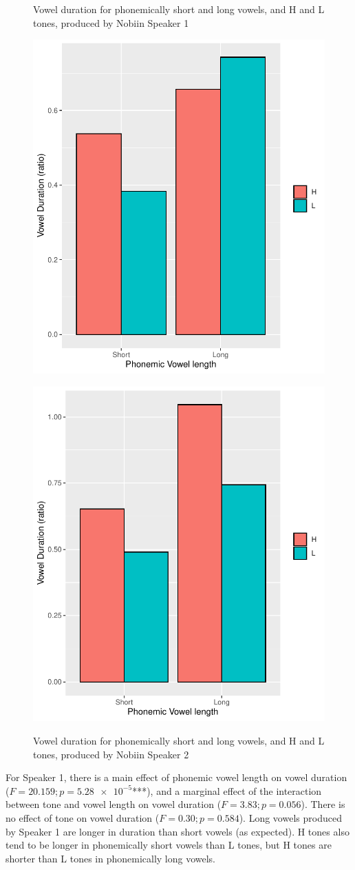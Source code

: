 \documentclass[output=paper]{langscibook}
\begin{document}
\begin{figure}
 \begin{floatrow}
  \captionsetup{margin=.05\linewidth}
   \ffigbox
     {\caption{Vowel duration for phonemically short and long vowels, and H and L tones, produced by Nobiin Speaker 1\label{fig:oakley:TanutVowelDur}}}
     {\includegraphics[width=.5\textwidth]{figures/TanutVowelDurBar.pdf}}%
   \ffigbox
     {\caption{Vowel duration for phonemically short and long vowels, and H and L tones, produced by Nobiin Speaker 2\label{fig:oakley:NubanVowelDur}}}
     {\includegraphics[width=.5\textwidth]{figures/NubanVowelDurBar.pdf}}
 \end{floatrow}
\end{figure}

For Speaker 1, there is a main effect of phonemic vowel length on vowel duration ($F=20.159; p=\num{5.28e-5}$***), and a marginal effect of the interaction between tone and vowel length on vowel duration ($F=3.83; p=0.056$). There is no effect of tone on vowel duration ($F=0.30; p=0.584$). Long vowels produced by Speaker 1 are longer in duration than short vowels (as expected). H tones also tend to be longer in phonemically short vowels than L tones, but H tones are shorter than L tones in phonemically long vowels. 
\end{document}
